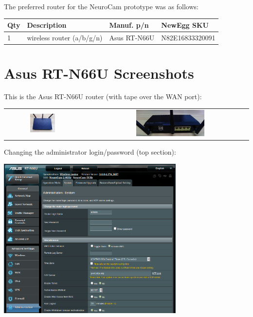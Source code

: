 The preferred router for the NeuroCam prototype was as follows:

\begin{tabular}{llll}\hline
Qty & Description & Manuf. p/n & NewEgg SKU \\
\hline
%
1 & wireless router (a/b/g/n) & Asus RT-N66U & N82E16833320091 \\
%
\hline
\end{tabular}

%
%
\clearpage
\section{Asus RT-N66U Screenshots}

This is the Asus RT-N66U router (with tape over the WAN port):
\begin{center}
\begin{tabular}{ccc}
\includegraphics[width=0.35\textwidth]{pics-system/sys-router-front.jpg} &
~ &
\includegraphics[width=0.45\textwidth]{pics-system/sys-router-back.jpg} \\
\end{tabular}
\end{center}

Changing the administrator login/password (top section):
\begin{center}
\includegraphics[width=0.7\textwidth]
{pics-router/asus-n66u-admin-pw.png}
\end{center}

